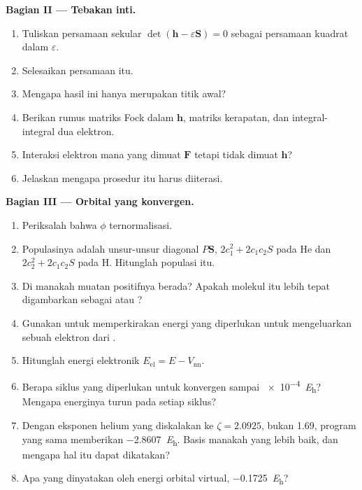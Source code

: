 \begin{problem}
\medskip\noindent\textbf{Bagian II --- Tebakan inti.}
\begin{enumerate}[resume, beginpenalty=10000]
  \item Tuliskan persamaan sekular $\det(\mathbf h - \varepsilon\mathbf S) = 0$
        sebagai persamaan kuadrat dalam $\varepsilon$.
  \item Selesaikan persamaan itu.
  \item Mengapa hasil ini hanya merupakan titik awal?
  \item Berikan rumus matriks Fock dalam $\mathbf h$, matriks kerapatan, dan
        integral-integral dua elektron.
  \item Interaksi elektron mana yang dimuat $\mathbf F$ tetapi tidak dimuat
        $\mathbf h$?
  \item Jelaskan mengapa prosedur itu harus diiterasi.
\end{enumerate}

\medskip\noindent\textbf{Bagian III --- Orbital yang konvergen.}
\begin{enumerate}[resume, beginpenalty=10000]
  \item Periksalah bahwa $\phi$ ternormalisasi.
  \item Populasinya adalah unsur-unsur diagonal $P\mathbf S$, $2c_1^2 + 2c_1c_2S$
        pada He dan $2c_2^2 + 2c_1c_2S$ pada H. Hitunglah populasi itu.
  \item Di manakah muatan positifnya berada? Apakah molekul itu lebih tepat
        digambarkan sebagai  atau ?
  \item Gunakan  untuk memperkirakan energi yang diperlukan
        untuk mengeluarkan sebuah elektron dari .
  \item Hitunglah energi elektronik $E_{\mathrm{el}} = E - V_{\mathrm{nn}}$.
  \item Berapa siklus yang diperlukan untuk konvergen sampai
        \qty{e-4}{\hartree}? Mengapa energinya turun pada setiap siklus?
  \item Dengan eksponen helium yang diskalakan ke $\zeta = 2.0925$, bukan
        1.69, program yang sama memberikan \qty{-2.8607}{\hartree}. Basis
        manakah yang lebih baik, dan mengapa hal itu dapat dikatakan?
  \item Apa yang dinyatakan oleh energi orbital virtual,
        \qty{-0.1725}{\hartree}?
\end{enumerate}


\end{problem}
